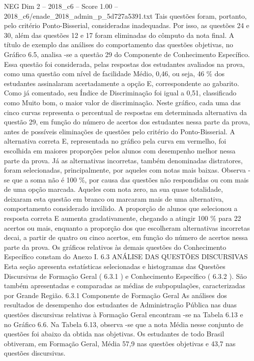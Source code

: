 \begin{textsample}{NEG Dim 2 – 2018\_c6 – Score 1.00 – 2018\_c6/enade\_2018\_admin\_p\_5d727a5391.txt}
Tais questões foram, portanto, pelo critério Ponto-Bisserial, consideradas inadequadas.
Por isso, as questões 24 e 30, além das questões 12 e 17 foram eliminadas do cômputo da nota final.
A título de exemplo das análises do comportamento das questões objetivas, no Gráfico 6.5, analisa -se a questão 29 do Componente de Conhecimento Específico.
Essa questão foi considerada, pelas respostas dos estudantes avaliados na prova, como uma questão com nível de facilidade Médio, 0,46, ou seja, 46 \% dos estudantes assinalaram acertadamente a opção E, correspondente ao gabarito.
Como já comentado, seu Índice de Discriminação foi igual a 0,51, classificado como Muito bom, o maior valor de discriminação.
Neste gráfico, cada uma das cinco curvas representa o percentual de respostas em determinada alternativa da questão 29, em função do número de acertos dos estudantes nessa parte da prova, antes de possíveis eliminações de questões pelo critério do Ponto-Bisserial.
A alternativa correta E, representada no gráfico pela curva em vermelho, foi escolhida em maiores proporções pelos alunos com desempenho melhor nessa parte da prova.
Já as alternativas incorretas, também denominadas distratores, foram selecionadas, principalmente, por aqueles com notas mais baixas.
Observa -se que a soma não é 100 \%, por causa das questões não respondidas ou com mais de uma opção marcada.
Aqueles com nota zero, na sua quase totalidade, deixaram esta questão em branco ou marcaram mais de uma alternativa, comportamento considerado inválido.
A proporção de alunos que selecionou a resposta correta E aumenta gradativamente, chegando a atingir 100 \% para 22 acertos ou mais, enquanto a proporção dos que escolheram alternativas incorretas decai, a partir de quatro ou cinco acertos, em função do número de acertos nessa parte da prova.
Os gráficos relativos às demais questões do Conhecimento Específico constam do Anexo I. 6.3 ANÁLISE DAS QUESTÕES DISCURSIVAS Esta seção apresenta estatísticas selecionadas e histogramas das Questões Discursivas de Formação Geral ( 6.3.1 ) e Conhecimento Específico ( 6.3.2 ).
São também apresentadas e comparadas as médias de subpopulações, caracterizadas por Grande Região. 6.3.1 Componente de Formação Geral As análises dos resultados de desempenho dos estudantes de Administração Pública nas duas questões discursivas relativas à Formação Geral encontram -se na Tabela 6.13 e no Gráfico 6.6.
Na Tabela 6.13, observa -se que a nota Média nesse conjunto de questões foi abaixo da obtida nas objetivas.
Os estudantes de todo Brasil obtiveram, em Formação Geral, Média 57,9 nas questões objetivas e 43,7 nas questões discursivas.

\end{textsample}
